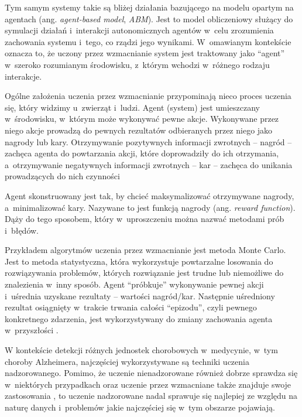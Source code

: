 \begin{itemize}
        Tym samym systemy takie są bliżej działania bazującego na modelu opartym na agentach (ang. \emph{agent-based model}, \emph{ABM}).
        Jest to model obliczeniowy służący do symulacji działań i~interakcji autonomicznych agentów w~celu zrozumienia zachowania systemu i~tego, co rządzi jego wynikami.
        W~omawianym kontekście oznacza to, że uczony przez wzmacnianie system jest traktowany jako ``agent'' w~szeroko rozumianym środowisku, z~którym wchodzi w~różnego rodzaju interakcje.

        Ogólne założenia uczenia przez wzmacnianie przypominają nieco proces uczenia się, który widzimy u~zwierząt i~ludzi.
        Agent (system) jest umieszczany w~środowisku, w~którym może wykonywać pewne akcje.
        Wykonywane przez niego akcje prowadzą do pewnych rezultatów odbieranych przez niego jako nagrody lub kary.
        Otrzymywanie pozytywnych informacji zwrotnych -- nagród -- zachęca agenta do powtarzania akcji, które doprowadziły do ich otrzymania, a~otrzymywanie negatywnych informacji zwrotnych -- kar -- zachęca do unikania prowadzących do nich czynności

        Agent skonstruowany jest tak, by chcieć maksymalizować otrzymywane nagrody, a~minimalizować kary.
        Nazywane to jest funkcją nagrody (ang. \emph{reward function}).
        Dąży do tego sposobem, który w~uproszczeniu można nazwać metodami prób i~błędów.

        Przykładem algorytmów uczenia przez wzmacnianie jest metoda Monte Carlo.
        Jest to metoda statystyczna, która wykorzystuje powtarzalne losowania do rozwiązywania problemów, których rozwiązanie jest trudne lub niemożliwe do znalezienia w~inny sposób.
        Agent ``próbkuje'' wykonywanie pewnej akcji i~uśrednia uzyskane rezultaty -- wartości nagród/kar.
        Następnie uśredniony rezultat osiągnięty w~trakcie trwania całości ``epizodu'', czyli pewnego konkretnego zdarzenia, jest wykorzystywany do zmiany zachowania agenta w~przyszłości \cite{thrun2000reinforcement}.

\end{itemize}

W kontekście detekcji różnych jednostek chorobowych w~medycynie, w~tym choroby Alzheimera, najczęściej wykorzystywane są techniki uczenia nadzorowanego.
Pomimo, że uczenie nienadzorowane również dobrze sprawdza się w~niektórych przypadkach \cite{raza2021tour} oraz uczenie przez wzmacniane także znajduje swoje zastosowania \cite{zhou2021deep}, to uczenie nadzorowane nadal sprawuje się najlepiej ze względu na naturę danych i~problemów jakie najczęściej się w~tym obszarze pojawiają.

